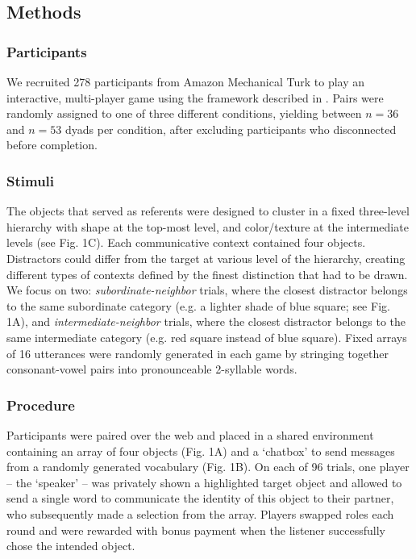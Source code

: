 \documentclass[10pt,letterpaper]{article}
\begin{document}
\subsection{Methods}

\subsubsection{Participants}

We recruited 278 participants from Amazon Mechanical Turk to play an interactive, multi-player game using the framework described in . Pairs were randomly assigned to one of three different conditions, yielding between $n=36$ and $n=53$ dyads per condition, after excluding participants who disconnected before completion.

\subsubsection{Stimuli}

The objects that served as referents were designed to cluster in a fixed three-level hierarchy with shape at the top-most level, and color/texture at the intermediate levels (see Fig. 1C). Each communicative context contained four objects. Distractors could differ from the target at various level of the hierarchy, creating different types of contexts defined by the finest distinction that had to be drawn. We focus on two: \emph{subordinate-neighbor} trials, where the closest distractor belongs to the same subordinate category (e.g. a lighter shade of blue square; see Fig. 1A), and \emph{intermediate-neighbor} trials, where the closest distractor belongs to the same intermediate category (e.g. red square instead of blue square). Fixed arrays of 16 utterances were randomly generated in each game by stringing together consonant-vowel pairs into pronounceable 2-syllable words.

\subsubsection{Procedure}

Participants were paired over the web and placed in a shared environment containing an array of four objects (Fig. 1A) and a `chatbox' to send messages from a randomly generated vocabulary (Fig. 1B). On each of 96 trials, one player -- the `speaker' -- was privately shown a highlighted target object and allowed to send a single word to communicate the identity of this object to their partner, who subsequently made a selection from the array. Players swapped roles each round and were rewarded with bonus payment when the listener successfully chose the intended object.
\end{document}
